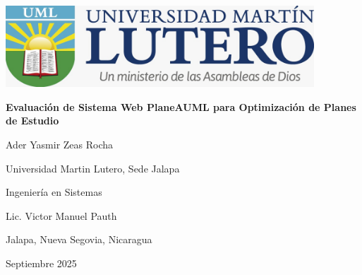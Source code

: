 \begin{titlepage}
     \par
    \vspace{0.5in}
    \centering
    \singlespacing

    \includegraphics[height=1.2in,keepaspectratio]{figuras/logo}
    \vspace{0.5in}

    \textbf{Evaluación de Sistema Web PlaneAUML para Optimización de Planes de Estudio} \par

    \vspace{1.5in}

    Ader Yasmir Zeas Rocha \par

    \vspace{0.5\baselineskip}

    Universidad Martin Lutero, Sede Jalapa \par

    \vspace{0.5\baselineskip}

    Ingeniería en Sistemas \par

    \vspace{0.5\baselineskip}

    Lic. Victor Manuel Pauth \par

    \vspace{0.5\baselineskip}

    Jalapa, Nueva Segovia, Nicaragua \par

    \vspace{0.5\baselineskip}

    Septiembre 2025 \par

\end{titlepage}